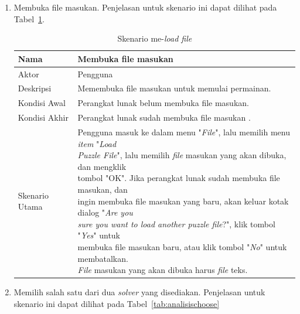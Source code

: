 \begin{enumerate}
\item Membuka {file} masukan. Penjelasan untuk skenario ini dapat dilihat pada Tabel~\ref{tab:analisisload}.

\begin{table}
\centering
\captionsetup{justification=centering}
\caption[Skenario me-\textit{load file}]{Skenario me-\textit{load file}}
\begin{tabular}{| l || l |}
\hline
Nama & Membuka {file} masukan \\
\hline
Aktor & Pengguna \\
\hline
Deskripsi & Memembuka file masukan untuk memulai permainan. \\
\hline
Kondisi Awal & Perangkat lunak belum membuka {file} masukan. \\
\hline
Kondisi Akhir & Perangkat lunak sudah membuka {file} masukan .\\
\hline
Skenario Utama & \makecell[l]{Pengguna masuk ke dalam menu "\textit{File}", lalu memilih menu \textit{item} "\textit{Load} \\ \textit{Puzzle File}", lalu memilih \textit{file} masukan yang akan dibuka, dan mengklik \\ tombol "OK". Jika perangkat lunak sudah membuka {file} masukan, dan \\ ingin membuka {file} masukan yang baru, akan keluar kotak dialog "\textit{Are you} \\ \textit{sure you want to load another puzzle file}?", klik tombol "\textit{Yes}" untuk \\ membuka {file} masukan baru, atau klik tombol "\textit{No}" untuk membatalkan. \\ \textit{File} masukan yang akan dibuka harus \textit{file} teks.} \\
\hline
\end{tabular}
\label{tab:analisisload}
\end{table}

\item Memilih salah satu dari dua \textit{solver} yang disediakan. Penjelasan untuk skenario ini dapat dilihat pada Tabel~\ref{tab:analisischoose}


\end{enumerate}
